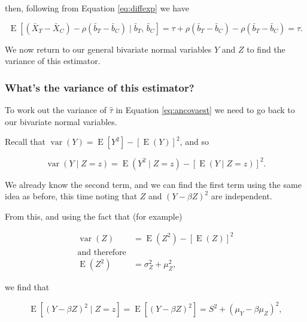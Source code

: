 \documentclass[
  openany]{book}
\theoremstyle{definition}
\theoremstyle{definition}
\theoremstyle{definition}
\theoremstyle{definition}
\theoremstyle{remark}
\begin{document}
then, following from Equation \eqref{eq:diffexp} we have

\[
\operatorname{E}\left[\left(\bar{X}_T - \bar{X}_C\right) - \rho \left(\bar{b}_T - \bar{b}_C\right)\mid{\bar{b}_T,\,\bar{b}_C}\right] = \tau + \rho\left(\bar{b}_T - \bar{b}_C\right)- \rho\left(\bar{b}_T - \bar{b}_C\right) = \tau. \]

We now return to our general bivariate normal variables \(Y\) and \(Z\) to find the variance of this estimator.

\subsubsection{What's the variance of this estimator?}\label{ancova-var}

To work out the variance of \(\hat{\tau}\) in Equation \eqref{eq:ancovaest} we need to go back to our bivariate normal variables.

Recall that \(\operatorname{var}\left(Y\right) = \operatorname{E}\left[Y^2\right] - \left[\operatorname{E}\left(Y\right)\right]^2\), and so

\begin{equation}
\operatorname{var}\left(Y\mid{Z=z}\right) = \operatorname{E}\left(Y^2\mid{Z=z}\right) - \left[\operatorname{E}\left(Y\mid{Z=z}\right)\right]^2. 
\label{eq:vary2}
\end{equation}

We already know the second term, and we can find the first term using the same idea as before, this time noting that \(Z\) and \(\left(Y-\beta Z\right)^2\) are independent.

From this, and using the fact that (for example)

\[
\begin{aligned}
\operatorname{var}\left(Z\right) & = \operatorname{E}\left(Z^2\right) - \left[\operatorname{E}\left(Z\right)\right]^2\\
\text{and therefore} & \\
\operatorname{E}\left(Z^2\right)  &= \sigma_Z^2 + \mu_Z^2,
\end{aligned}
\]

we find that

\begin{equation}
\operatorname{E}\left[\left(Y-\beta Z\right)^2 \mid Z=z\right] = \operatorname{E}\left[\left(Y-\beta Z\right)^2\right] =S^2 + \left(\mu_Y - \beta \mu_Z\right)^2,
\label{eq:evary1}
\end{equation}
\end{document}
